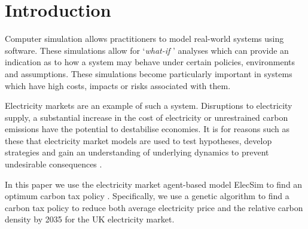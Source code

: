 \documentclass[sigconf]{acmart}
\begin{document}





\maketitle

\section{Introduction}



Computer simulation allows practitioners to model real-world systems using software. These simulations allow for `\textit{what-if} ' analyses which can provide an indication as to how a system may behave under certain policies, environments and assumptions. These simulations become particularly important in systems which have high costs, impacts or risks associated with them.


Electricity markets are an example of such a system. Disruptions to electricity supply, a substantial increase in the cost of electricity or unrestrained carbon emissions have the potential to destabilise economies. It is for reasons such as these that electricity market models are used to test hypotheses, develop strategies and gain an understanding of underlying dynamics to prevent undesirable consequences \cite{Jebaraj2006}. 

In this paper we use the electricity market agent-based model ElecSim to find an optimum carbon tax policy \cite{Kell}. Specifically, we use a genetic algorithm to find a carbon tax policy to reduce both average electricity price and the relative carbon density by 2035 for the UK electricity market. 
\end{document}
